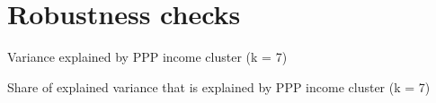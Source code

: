 \documentclass[aspectratio=169,xcolor=dvipsnames, 11pt,mathserif]{beamer}
\begin{document}
\appendix

\section{Robustness checks}

\begin{frame}{Variance explained by PPP income cluster (k = 7) \label{gdp_add}\hyperlink{gdp}{}}
    
\end{frame}

\begin{frame}{Share of explained variance that is explained by PPP income cluster (k = 7)\label{share_gdp_add}\hyperlink{share_gdp}{}} %
    
\end{frame}
\end{document}
